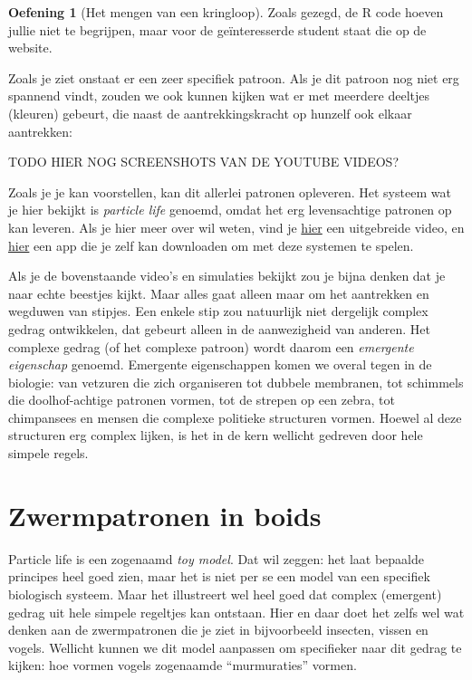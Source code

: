 \documentclass[
  a4paper,
]{scrbook}
\theoremstyle{definition}
\newtheorem{exercise}{Oefening}[chapter]
\theoremstyle{remark}
\begin{document}
\begin{exercise}[Het mengen van een
kringloop]
Zoals gezegd, de R code hoeven jullie niet te begrijpen, maar voor de
geïnteresserde student staat die op de website.

Zoals je ziet onstaat er een zeer specifiek patroon. Als je dit patroon
nog niet erg spannend vindt, zouden we ook kunnen kijken wat er met
meerdere deeltjes (kleuren) gebeurt, die naast de aantrekkingskracht op
hunzelf ook elkaar aantrekken:

TODO HIER NOG SCREENSHOTS VAN DE YOUTUBE VIDEOS?

Zoals je je kan voorstellen, kan dit allerlei patronen opleveren. Het
systeem wat je hier bekijkt is \emph{particle life} genoemd, omdat het
erg levensachtige patronen op kan leveren. Als je hier meer over wil
weten, vind je \href{https://www.youtube.com/watch?v=p4YirERTVF0}{hier}
een uitgebreide video, en
\href{https://webgl-particle-life.netlify.app/}{hier} een app die je
zelf kan downloaden om met deze systemen te spelen.

Als je de bovenstaande video's en simulaties bekijkt zou je bijna denken
dat je naar echte beestjes kijkt. Maar alles gaat alleen maar om het
aantrekken en wegduwen van stipjes. Een enkele stip zou natuurlijk niet
dergelijk complex gedrag ontwikkelen, dat gebeurt alleen in de
aanwezigheid van anderen. Het complexe gedrag (of het complexe patroon)
wordt daarom een \emph{emergente eigenschap} genoemd. Emergente
eigenschappen komen we overal tegen in de biologie: van vetzuren die
zich organiseren tot dubbele membranen, tot schimmels die
doolhof-achtige patronen vormen, tot de strepen op een zebra, tot
chimpansees en mensen die complexe politieke structuren vormen. Hoewel
al deze structuren erg complex lijken, is het in de kern wellicht
gedreven door hele simpele regels.

\section{Zwermpatronen in boids}\label{zwermpatronen-in-boids}

Particle life is een zogenaamd \emph{toy model}. Dat wil zeggen: het
laat bepaalde principes heel goed zien, maar het is niet per se een
model van een specifiek biologisch systeem. Maar het illustreert wel
heel goed dat complex (emergent) gedrag uit hele simpele regeltjes kan
ontstaan. Hier en daar doet het zelfs wel wat denken aan de
zwermpatronen die je ziet in bijvoorbeeld insecten, vissen en vogels.
Wellicht kunnen we dit model aanpassen om specifieker naar dit gedrag te
kijken: hoe vormen vogels zogenaamde ``murmuraties'' vormen.


\end{exercise}
\end{document}
